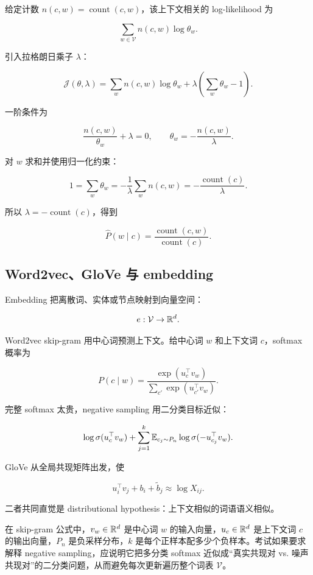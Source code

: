 给定计数 \(n(c,w)=\operatorname{count}(c,w)\)，该上下文相关的 log-likelihood 为

\[
  \sum_{w\in\mathcal{V}}
  n(c,w)\log\theta_w.
\]

引入拉格朗日乘子 \(\lambda\)：

\[
  \mathcal{J}(\theta,\lambda)
  =
  \sum_w n(c,w)\log\theta_w
  +
  \lambda\left(\sum_w\theta_w-1\right).
\]

一阶条件为

\[
  \frac{n(c,w)}{\theta_w}+\lambda=0,
  \qquad
  \theta_w=-\frac{n(c,w)}{\lambda}.
\]

对 \(w\) 求和并使用归一化约束：

\[
  1=\sum_w\theta_w
  =
  -\frac{1}{\lambda}
  \sum_w n(c,w)
  =
  -\frac{\operatorname{count}(c)}{\lambda}.
\]

所以 \(\lambda=-\operatorname{count}(c)\)，得到

\[
  \widehat P(w\mid c)
  =
  \frac{\operatorname{count}(c,w)}{\operatorname{count}(c)}.
\]

\subsection{Word2vec、GloVe 与 embedding}


Embedding 把离散词、实体或节点映射到向量空间：

\[
  e:\mathcal{V}\to\mathbb{R}^d.
\]

Word2vec skip-gram 用中心词预测上下文。给中心词 \(w\) 和上下文词 \(c\)，softmax 概率为

\[
  P(c\mid w)
  =
  \frac{\exp(u_c^\top v_w)}
  {\sum_{c'}\exp(u_{c'}^\top v_w)}.
\]

完整 softmax 太贵，negative sampling 用二分类目标近似：

\[
  \log\sigma(u_c^\top v_w)
  +
  \sum_{j=1}^{k}
  \mathbb{E}_{c_j\sim P_n}
  \log\sigma(-u_{c_j}^\top v_w).
\]

GloVe 从全局共现矩阵出发，使

\[
  u_i^\top v_j+b_i+\tilde b_j
  \approx
  \log X_{ij}.
\]

二者共同直觉是 distributional hypothesis：上下文相似的词语语义相似。

在 skip-gram 公式中，\(v_w\in\mathbb{R}^d\) 是中心词 \(w\) 的输入向量，\(u_c\in\mathbb{R}^d\) 是上下文词 \(c\) 的输出向量，\(P_n\) 是负采样分布，\(k\) 是每个正样本配多少个负样本。考试如果要求解释 negative sampling，应说明它把多分类 softmax 近似成“真实共现对 vs. 噪声共现对”的二分类问题，从而避免每次更新遍历整个词表 \(\mathcal{V}\)。


